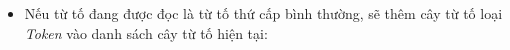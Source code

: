 \begin{itemize}

              
  
  \item Nếu từ tố đang được đọc là từ tố thứ cấp bình thường, sẽ thêm cây từ tố loại \textit{Token} vào danh sách cây từ tố hiện tại:
  

  
\end{itemize}